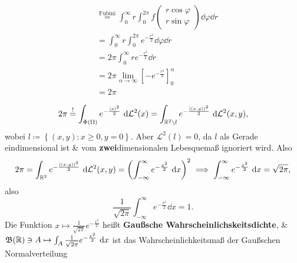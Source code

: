 \begin{example*}
\begin{itemize}
\begin{align*}
				~ &\overset{\text{Fubini} }{=} \int_{0}^{\infty} r \int_{0}^{2 \pi } f \begin{pmatrix} r \cos \varphi \\ r \sin  \varphi \end{pmatrix} \dd \varphi \dd r \\
				~ &= \int_{0}^{\infty} r \int_{0}^{2 \pi } e ^{- \frac{ r^2 }{ 2 } } \dd \varphi \dd r \\
				~ &= 2 \pi \int_{0}^{\infty} r e ^{- \frac{ r^2 }{ 2 } } \dd r \\
				~ &= 2 \pi  \lim_{\alpha \to \infty} \left[ - e ^{- \frac{ r^2 }{ 2 } }  \right]_{0} ^{\alpha}  \\
				~ &= 2 \pi
			\end{align*}
	\end{itemize}
	\[
		2 \pi \overset{!}{=} \int _{\Phi (\Omega)} e ^{- \frac{\left| x \right| ^2}{ 2 } } ~\text{d} \mathcal{L}^2 (x) = \int _{\mathbb{R} ^2 \setminus l} e ^{- \frac{ \left| (x, y) \right| ^2 }{ 2 } } ~\text{d} \mathcal{L} ^2(x, y), 
	\]
	wobei $ l \coloneqq \left\{ (x, y) : x \geq 0, y = 0 \right\} . $ 
	Aber $ \mathcal{L} ^2(l) = 0 $, da $ l $ als Gerade eindimensional ist \& vom \textbf{zwei}dimensionalen Lebesquemaß ignoriert wird.
	Also
	\[
		2 \pi = \int _{\mathbb{R} ^2} e ^{- \frac{\left| (x, y) \right| ^2 }{ 2 } } ~\text{d} \mathcal{L} ^2 (x, y) = \left( \int_{- \infty}^{\infty} e ^{- \frac{ x^2 }{ 2 } } ~\text{d} x \right) ^2 \implies \int_{- \infty}^{\infty} e ^{- \frac{ x^2 }{ 2 } } ~\text{d} x = \sqrt{2 \pi } ,
	\]
	also 
	\[
		\frac{ 1 }{ \sqrt{2 \pi }  } \int_{- \infty}^{\infty} e ^{- \frac{ x^2 }{ 2 } } \dd x = 1.
	\]
	Die Funktion $ x \mapsto \frac{ 1 }{ \sqrt{2 \pi }  } e ^{- \frac{ x^2 }{ 2 } }  $ heißt \textbf{Gaußsche Wahrscheinlichskeitsdichte}, \& $ \mathfrak{B} (\mathbb{R} ) \ni A \mapsto \int_{A}^{} \frac{ 1 }{ \sqrt{2 \pi }  } e ^{- \frac{ x^2 }{ 2 } } ~\text{d} x $ ist das Wahrscheinlichkeitsmaß der Gaußschen Normalverteilung
\end{example*}

